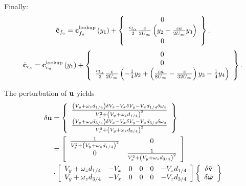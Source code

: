 Finally:
\begin{equation}
	\tilde{\T{c}}_{f_{a}} = 
		\T{c}_{f_a}^\text{lookup}\plbr{y_1} +
		\cubr{\cvvect{
			0 \\
			\frac{c_{l_\alpha}}{2} \frac{c}{2 U_\infty} \plbr{ y_2 - \frac{c a}{2 U_\infty} y_3} \\ 
			0
		}}.
\end{equation}
\begin{equation}
	\tilde{\T{c}}_{c_{a}} = 
		\T{c}_{c_a}^\text{lookup}\plbr{y_1} + \left\{
		\begin{array}{c}
		0 \\ 0\\
		\frac{c_{l_\alpha}}{2} \frac{c}{2 U_\infty}
		 \plbr{ -\frac{1}{4} y_2 +
		\plbr{\frac{ c a}{8 U_\infty} - \frac{c}{32 U_\infty} } y_3 
		-\frac{1}{4} y_4}
		\end{array}
		\right\}.
\end{equation}

The perturbation of $\T{u}$ yields
\begin{align}
	\delta\T{u}
	&=
	\cubr{\cvvect{
		\frac{
			\plbr{V_y + \omega_z d_{1/4}} \delta V_x - V_x \delta V_y - V_x d_{1/4} \delta\omega_z
		}{
			V_x^2 + \plbr{V_y + \omega_z d_{1/4}}^2
		}
		\\
		\frac{
			\plbr{V_y + \omega_z d_{3/4}} \delta V_x - V_x \delta V_y - V_x d_{3/4} \delta\omega_z
		}{
			V_x^2 + \plbr{V_y + \omega_z d_{3/4}}^2
		}
	}}
	\nonumber \\
	&= \sqbr{\matr{cc}{
		\frac{1}{V_x^2 + \plbr{V_y + \omega_z d_{1/4}}^2} & 0 \\
		0 & \frac{1}{V_x^2 + \plbr{V_y + \omega_z d_{3/4}}^2}
	}}
	\nonumber \\
	&\mbox{} \cdot \sqbr{\matr{cccccc}{
		V_y + \omega_z d_{1/4} & - V_x & 0 & 0 & 0 & - V_x d_{1/4} \\
		V_y + \omega_z d_{3/4} & - V_x & 0 & 0 & 0 & - V_x d_{3/4}
	}} \cubr{\cvvect{
		\delta\tilde{\T{v}} \\
		\delta\tilde{\T{\omega}}
	}}
\end{align}
